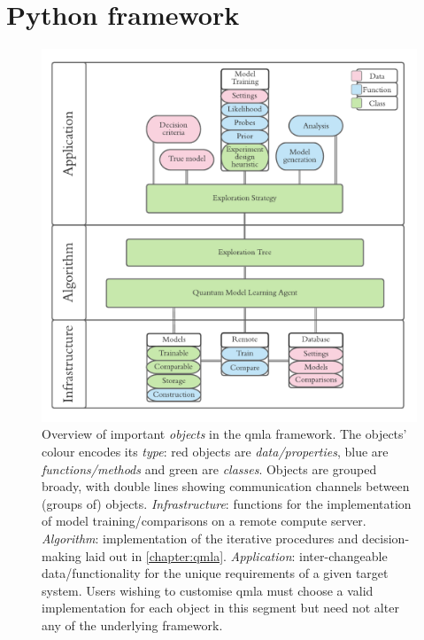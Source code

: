 \section{Python framework}
\begin{figure}
    \includegraphics{algorithms/figures/software_overview.pdf}
    \caption[QMLA codebase overview]{
        Overview of important \emph{objects} in the \gls{qmla} framework.
        The objects' colour encodes its \emph{type}: 
            red objects are \emph{data/properties},
            blue are \emph{functions/methods} 
            and green are \emph{classes}. 
        Objects are grouped broady, with double lines showing communication channels between (groups of) objects. 
        \emph{Infrastructure}: functions for the implementation of model training/comparisons on 
            a remote compute server.
        \emph{Algorithm}: implementation of the iterative procedures and decision-making 
        laid out in \cref{chapter:qmla}. 
        \emph{Application}: inter-changeable data/functionality for the unique requirements 
        of a given target system. 
        Users wishing to customise \gls{qmla} must choose a valid implementation for each object in this segment
            but need not alter any of the underlying framework.
    }
    \label{fig:software_overview}
\end{figure}

